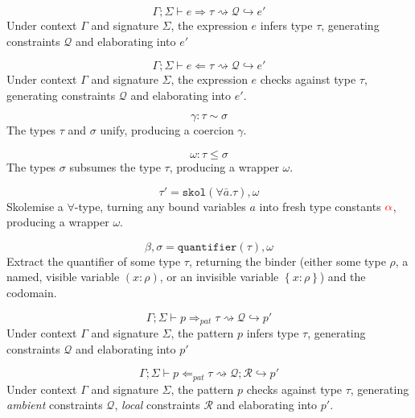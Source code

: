 \documentclass[11pt]{article}
\newcommand{\checks}{\Leftarrow}
\newcommand{\infers}{\Rightarrow}
\newcommand{\cons}{\rightsquigarrow}
\newcommand{\reduces}{\hookrightarrow}
\newcommand{\skol}[1]{\mathtt{skol}\left(#1\right)}
\newcommand{\quant}[1]{\mathtt{quantifier}\left(#1\right)}
\newcommand{\skv}[1]{{\color{red} \mathbf{#1}}}
\newcommand{\Ambient}{\Gamma; \Sigma \vdash}
\begin{document}
$$\Ambient e \infers \tau \cons \mathscr{Q} \reduces e'$$
Under context $\Gamma$ and signature $\Sigma$, the expression $e$ infers type
$\tau$, generating constraints $\mathscr{Q}$ and elaborating into $e'$

$$\Ambient e \checks \tau \cons \mathscr{Q} \reduces e'$$
Under context $\Gamma$ and signature $\Sigma$, the expression $e$ checks
against type $\tau$, generating constraints $\mathscr{Q}$ and elaborating into
$e'$.

$$\gamma: \tau \sim \sigma$$
The types $\tau$ and $\sigma$ unify, producing a coercion $\gamma$.

$$\omega: \tau \le \sigma$$
The types $\sigma$ subsumes the type $\tau$, producing a wrapper $\omega$.

$$\tau' = \skol{\forall{\bar{a}}. \tau}, \omega$$
Skolemise a $\forall$-type, turning any bound variables $a$ into fresh
type constants $\skv{\alpha}$, producing a wrapper $\omega$.

$$\beta, \sigma = \quant{\tau}, \omega$$
Extract the quantifier of some type $\tau$, returning the binder (either some
type $\rho$, a named, visible variable $\left(x:\rho\right)$, or an invisible
variable $\left\{x:\rho\right\}$) and the codomain.

$$\Ambient p \infers_{pat} \tau \cons \mathscr{Q} \reduces p'$$
Under context $\Gamma$ and signature $\Sigma$, the pattern $p$ infers type
$\tau$, generating constraints $\mathscr{Q}$ and elaborating into $p'$

$$\Ambient p \checks_{pat} \tau \cons \mathscr{Q}; \mathscr{R} \reduces p'$$
Under context $\Gamma$ and signature $\Sigma$, the pattern $p$ checks against
type $\tau$, generating \textit{ambient} constraints $\mathscr{Q}$,
\textit{local} constraints $\mathscr{R}$ and elaborating into $p'$.
\end{document}
